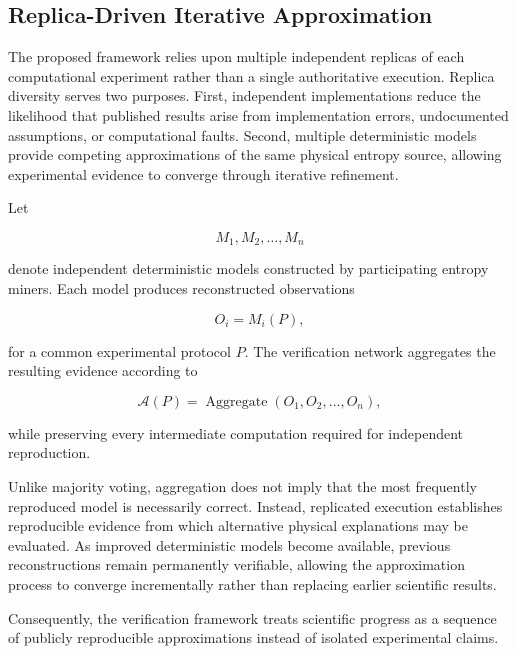 \documentclass[11pt]{article}
\begin{document}



\subsection{Replica-Driven Iterative Approximation}

The proposed framework relies upon multiple independent replicas of
each computational experiment rather than a single authoritative
execution.
Replica diversity serves two purposes.
First,
independent implementations reduce the likelihood that published
results arise from implementation errors,
undocumented assumptions,
or computational faults.
Second,
multiple deterministic models provide competing approximations of the
same physical entropy source,
allowing experimental evidence to converge through iterative refinement.

Let

\[
M_1,M_2,\ldots,M_n
\]

denote independent deterministic models constructed by participating
entropy miners.
Each model produces reconstructed observations

\[
O_i=M_i(P),
\]

for a common experimental protocol \(P\).
The verification network aggregates the resulting evidence according to

\[
\mathcal{A}(P)
=
\operatorname{Aggregate}
\left(
O_1,O_2,\ldots,O_n
\right),
\]

while preserving every intermediate computation required for
independent reproduction.

Unlike majority voting,
aggregation does not imply that the most frequently reproduced model is
necessarily correct.
Instead,
replicated execution establishes reproducible evidence from which
alternative physical explanations may be evaluated.
As improved deterministic models become available,
previous reconstructions remain permanently verifiable,
allowing the approximation process to converge incrementally rather
than replacing earlier scientific results.

Consequently,
the verification framework treats scientific progress as a sequence of
publicly reproducible approximations instead of isolated experimental
claims.
\end{document}
